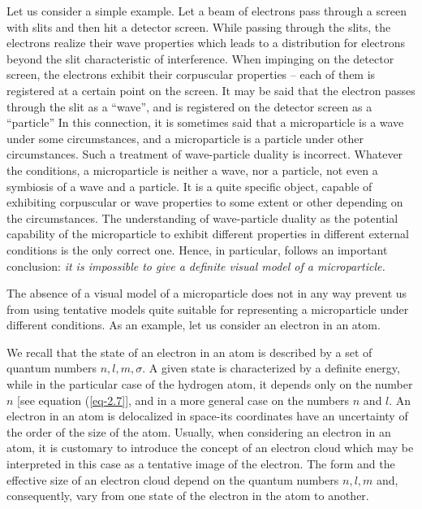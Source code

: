 \documentclass[a4paper,sfsidenotes,colorlinks=true]{tufte-book}
\numberwithin{equation}{section}
\numberwithin{figure}{section}
\begin{document}
Let us consider a simple example. Let a beam of electrons pass through
a screen with slits and then hit a detector screen. While passing
through the slits, the electrons realize their wave properties which
leads to a distribution for electrons beyond the slit characteristic
of interference. When impinging on the detector screen, the electrons
exhibit their corpuscular properties -- each of them is registered at
a certain point on the screen. It may be said that the electron passes
through the slit as a ``wave'', and is registered on the detector
screen as a ``particle'' In this connection, it is sometimes said that
a microparticle is a wave under some circumstances, and a
microparticle is a particle under other circumstances. Such a
treatment of wave-particle duality is incorrect. Whatever the
conditions, a microparticle is neither a wave, nor a particle, not
even a symbiosis of a wave and a particle. It is a quite specific
object, capable of exhibiting corpuscular or wave properties to some
extent or other depending on the circumstances. The understanding of
wave-particle duality as the potential capability of the microparticle
to exhibit different properties in different external conditions is
the only correct one. Hence, in particular, follows an important
conclusion: \emph{it is impossible to give a definite visual model of a
microparticle.}

The absence  of a visual model of a
microparticle does not in any way prevent us from using tentative
models quite suitable for representing a microparticle under different
conditions. As an example, let us consider an electron in an atom.

We recall that the state of an electron in an atom is described by a
set of quantum numbers $n, l, m,\sigma$. A given state is
characterized by a definite energy, while in the particular case of
the hydrogen atom, it depends only on the number $n$ [see equation
(\ref{eq-2.7}], and in a more general case on the numbers $n$ and
  $l$. An electron in an atom is delocalized in space-its coordinates
  have an uncertainty of the order of the size of the atom. Usually,
  when considering an electron in an atom, it is customary to
  introduce the concept of an electron cloud which may be interpreted
  in this case as a tentative image of the electron. The form and the
  effective size of an electron cloud depend on the quantum numbers $n,
  l, m$ and, consequently, vary from one state of the electron in the
  atom to another.
\end{document}
